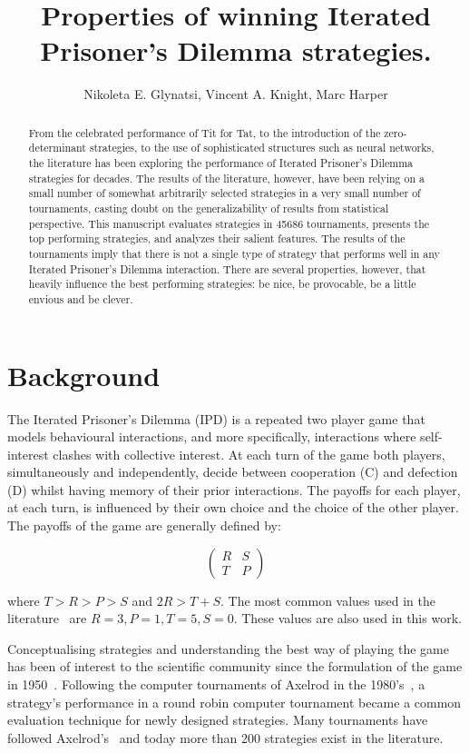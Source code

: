 \documentclass{article}
\title{Properties of winning Iterated Prisoner's Dilemma strategies.}
\author{Nikoleta E. Glynatsi, Vincent A. Knight, Marc Harper}
\date{}
\newcommand{\numberofstrategies}{}
\begin{document}
\maketitle

\begin{abstract}
From the celebrated performance of Tit for Tat, to the
introduction of the zero-determinant strategies, to the use of sophisticated
structures such as neural networks, the literature has been exploring the
performance of Iterated Prisoner's Dilemma strategies for decades. The results of the literature,
however, have been relying on a small number of somewhat arbitrarily selected
strategies in a very small number of tournaments,
casting doubt on the generalizability of results from statistical perspective.
This manuscript evaluates \numberofstrategies strategies in 45686
tournaments, presents the top performing strategies, and analyzes their
salient features. The results of the tournaments imply that there is not a single
type of strategy that performs well in any Iterated Prisoner's Dilemma interaction.
There are several properties, however, that heavily influence the best performing
strategies: be nice, be provocable, be a little envious and be clever.
\end{abstract}

\section{Background}

The Iterated Prisoner's Dilemma (IPD) is a repeated two player game that models
behavioural interactions, and more specifically, interactions where
self-interest clashes with collective interest. At each turn of the game both
players, simultaneously and independently, decide between cooperation (C) and
defection (D) whilst having memory of their prior interactions. The payoffs for each
player, at each turn, is influenced by their own choice and the choice of the
other player. The payoffs of the game are generally defined by:

\[\begin{pmatrix}
R & S \\
T & P
\end{pmatrix}\]

where \(T > R > P > S\) and \(2R > T + S\). The most common values used in
the literature~\cite{Axelrod1981} are $R=3, P=1, T=5, S=0$. These values are also
used in this work.

Conceptualising strategies and understanding the best way of playing the game
has been of interest to the scientific community since the formulation of the
game in 1950~\cite{Flood1958}. Following the computer tournaments of Axelrod in the
1980's~\cite{Axelrod1980a, Axelrod1980b}, a strategy's performance in a round
robin computer tournament became a common evaluation technique for newly designed
strategies. Many tournaments have followed Axelrod's~\cite{Bendor1991,
Harper2017, Kendall2007, Stephens2002, Stewart2012} and today more than 200
strategies exist in the literature.
\end{document}
